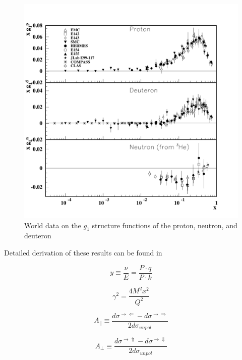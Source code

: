 \begin{figure}
  \includegraphics[width=1.0\textwidth]{figures/g1vsx}
  \caption{World data on the $g_1$ structure functions of the proton, neutron, and deuteron \cite{Amsler:2008zzb}}
  \label{fig:g1vsx}
\end{figure}

Detailed derivation of these results can be found in \cite{Anselmino:1994gn}

\begin{equation}
  y \equiv \frac{\nu}{E} = \frac{P \cdot q}{P \cdot k}
\end{equation}

\begin{equation}
  \gamma^2 = \frac{4M^2x^2}{Q^2}
\end{equation}

\begin{equation}
  A_{\parallel} \equiv \frac{d\sigma^{\rightarrow \Leftarrow} - d\sigma^{\rightarrow \Rightarrow}}{2d\sigma_{unpol}}
\end{equation}

\begin{equation}
  A_{\perp} \equiv \frac{d\sigma^{\rightarrow \Uparrow} - d\sigma^{\rightarrow \Downarrow}}{2d\sigma_{unpol}}
\end{equation}